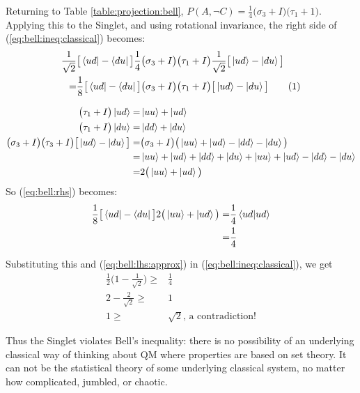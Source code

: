 \documentclass[]{article}
\newcommand\numberthis{\addtocounter{equation}{1}\tag{\theequation}}
\begin{document}
Returning to Table \ref{table:projection:bell}, $P(A, \neg C) = \frac{1}{4}\big(\sigma_3 + I\big) \big(\tau_1+1\big)$. Applying this to the Singlet, and using rotational invariance, the right side of (\ref{eq:bell:ineq:classical}) becomes:
\begin{align*}
	\frac{1}{\sqrt{2}}&\big[\bra{ud}-\bra{du}\big]\frac{1}{4}\big(\sigma_3 + I\big) \big(\tau_1+I\big)\frac{1}{\sqrt{2}}\big[\ket{ud}-\ket{du}\big]\\
	=&\frac{1}{8}\big[\bra{ud}-\bra{du}\big]\big(\sigma_3 + I\big) \big(\tau_1+I\big)\big[\ket{ud}-\ket{du}\big] \numberthis \label{eq:bell:rhs}
\end{align*}

\begin{align*}
	\big(\tau_1+I\big) \ket{ud} =& \ket{uu} + \ket{ud}\\
	\big(\tau_1+I\big) \ket{du} =& \ket{dd} + \ket{du}\\
	\big(\sigma_3 + I\big) \big(\tau_3+I\big)\big[\ket{ud}-\ket{du}\big]=&
	\big(\sigma_3 + I\big) \big(\ket{uu} + \ket{ud}-\ket{dd} - \ket{du} \big)\\
	=& \ket{uu} + \ket{ud}+\ket{dd} + \ket{du} + \ket{uu} + \ket{ud}-\ket{dd} - \ket{du}\\
	=& 2 \big(\ket{uu} + \ket{ud}\big)
\end{align*}
So (\ref{eq:bell:rhs}) becomes:
\begin{align*}
	\frac{1}{8}\big[\bra{ud}-\bra{du}\big] 2 \big(\ket{uu} + \ket{ud}\big) =& \frac{1}{4}\braket{ud|ud}\\
	=&\frac{1}{4}
\end{align*}

Substituting this and (\ref{eq:bell:lhs:approx}) in (\ref{eq:bell:ineq:classical}), we get 
\begin{align*}
	\frac{1}{2}\big(1-\frac{1}{\sqrt{2}}\big) \ge &\frac{1}{4}\\
	2-\frac{2}{\sqrt{2}} \ge& 1\\
	1 \ge& \sqrt{2} \text{, a contradiction!}
\end{align*}

Thus the Singlet violates Bell's inequality: there is no possibility of an underlying classical way of thinking about QM where properties are based on set theory. It can not be the statistical theory of some underlying classical system, no matter how complicated, jumbled, or chaotic. 
\end{document}
